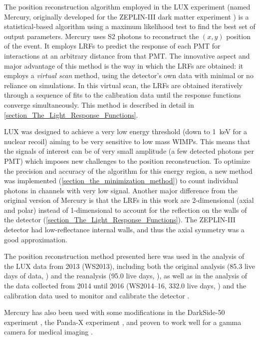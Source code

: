 \documentclass[a4paper,11pt]{article}
\begin{document}
The position reconstruction algorithm employed in the LUX experiment (named Mercury, originally developed for the ZEPLIN-III dark matter experiment \cite{Solovov2011_PositionReconstruction}) is a statistical-based algorithm using a maximum likelihood test to find the best set of output parameters. Mercury uses S2 photons to reconstruct the $(x, y)$ position of the event. It employs LRFs to predict the response of each PMT for interactions at an arbitrary distance from that PMT. The innovative aspect and major advantage of this method is the way in which the LRFs are obtained: it employs a \emph{virtual scan} method, using the detector's own data with minimal or no reliance on simulations. In this virtual scan, the LRFs are obtained iteratively through a sequence of fits to the calibration data until the response functions converge simultaneously. This method is described in detail in \cref{section_The_Light_Response_Functions}.

LUX was designed to achieve a very low energy threshold (down to 1~keV for a nuclear recoil) aiming to be very sensitive to low mass WIMPs. This means that the signals of interest can be of very small amplitude (a few detected photons per PMT) which imposes new challenges to the position reconstruction. To optimize the precision and accuracy of the algorithm for this energy region, a new method was implemented (\cref{section_the_minimization_method}) to count individual photons in channels with very low signal. Another major difference from the original version of Mercury is that the LRFs in this work are 2-dimensional (axial and polar) instead of 1-dimensional to account for the reflection on the walls of the detector (\cref{section_The_Light_Response_Functions}). The ZEPLIN-III detector had low-reflectance internal walls, and thus the axial symmetry was a good approximation.

The position reconstruction method presented here was used in the analysis of the LUX data from 2013 (WS2013), including both the original analysis (85.3 live days of data, \cite{LUX2014_OriginalResults}) and the reanalysis (95.0 live days, \cite{LUX2015_ReanalysisPRL, LUX2016SpinDependent, LUX2017_Axions}), as well as in the analysis of the data collected from 2014 until 2016 (WS2014--16, 332.0 live days, \cite{LUX2016_SSR, LUX2017_SD}) and the calibration data used to monitor and calibrate the detector \cite{hertel2015, TritiumPaper2015, LUX2016_DDCalibrations}.
   
Mercury has also been used with some modifications in the DarkSide-50 experiment \cite{Darkside2015_FirstResults}, the Panda-X experiment \cite{PandaX_2016}, and proven to work well for a gamma camera for medical imaging \cite{Morozov2015_PosRec}.
\end{document}

